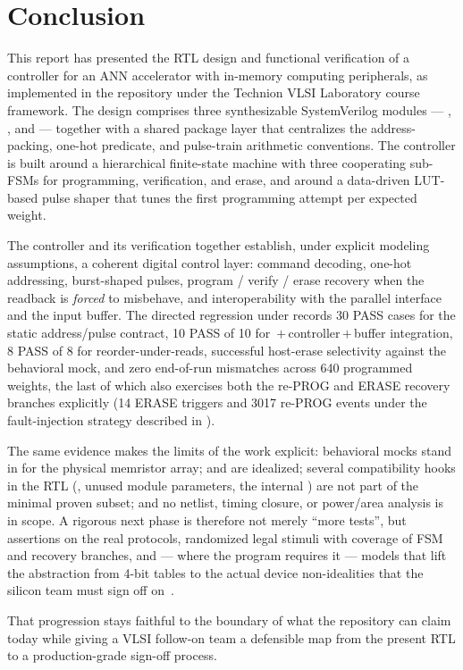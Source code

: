 
\chapter{Conclusion}
\label{ch:conclusion}

This report has presented the RTL design and functional verification of
a controller for an ANN accelerator with in-memory computing
peripherals, as implemented in the repository under the Technion VLSI
Laboratory course framework. The design comprises three synthesizable
SystemVerilog modules --- ,
, and  --- together
with a shared package layer that centralizes the address-packing,
one-hot predicate, and pulse-train arithmetic conventions. The
controller is built around a hierarchical finite-state machine with
three cooperating sub-FSMs for programming, verification, and erase,
and around a data-driven LUT-based pulse shaper that tunes the first
programming attempt per expected weight.

The controller and its verification together establish, under explicit
modeling assumptions, a coherent digital control layer: command
decoding, one-hot addressing, burst-shaped pulses, program /
verify / erase recovery when the readback is \emph{forced} to misbehave,
and interoperability with the parallel interface and the input
buffer. The directed regression under  records 30 PASS
cases for the static address/pulse contract, 10 PASS of 10 for
\,\(+\)\,controller\,\(+\)\,buffer integration, 8 PASS of 8 for
reorder-under-reads, successful host-erase selectivity against the
behavioral mock, and zero end-of-run mismatches across 640 programmed
weights, the last of which also exercises both the re-PROG and ERASE
recovery branches explicitly (14 ERASE triggers and 3017 re-PROG
events under the fault-injection strategy described in
).

The same evidence makes the limits of the work explicit: behavioral
mocks stand in for the physical memristor array;  and
 are idealized; several compatibility hooks
in the RTL (, unused module parameters, the internal
) are not part of the minimal proven subset;
and no netlist, timing closure, or power/area analysis is in scope. A
rigorous next phase is therefore not merely ``more tests'', but
assertions on the real protocols, randomized legal stimuli with
coverage of FSM and recovery branches, and --- where the program
requires it --- models that lift the abstraction from 4-bit tables to
the actual device non-idealities that the silicon team must sign off
on~\cite{Ielmini2018RRAM, Sebastian2020IMC, Wang2022YFlash}.

That progression stays faithful to the boundary of what the repository
can claim today while giving a VLSI follow-on team a defensible map
from the present RTL to a production-grade sign-off process.
